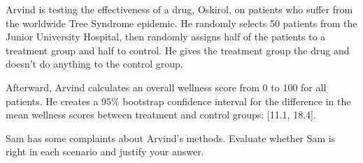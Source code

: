 \question Arvind is testing the effectiveness of a drug, Oskirol, on patients
who suffer from the worldwide Tree Syndrome epidemic. He randomly selects 50
patients from the Junior University Hospital, then randomly assigns half of the
patients to a treatment group and half to control. He gives the treatment group
the drug and doesn't do anything to the control group.

Afterward, Arvind calculates an overall wellness score from 0 to 100 for all
patients. He creates a 95\% bootstrap confidence interval for the difference in
the mean wellness scores between treatment and control groups: [11.1,
18.4].

Sam has some complaints about Arvind's methods. Evaluate whether Sam is right
in each scenario and justify your answer.

